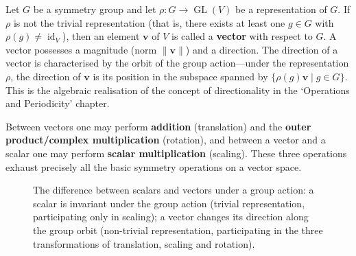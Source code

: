 \begin{definition}[Vector]\label{def:vector}
Let $G$ be a symmetry group and let $\rho: G \to \operatorname{GL}(V)$ be a representation of $G$. If $\rho$ is not the trivial representation (that is, there exists at least one $g \in G$ with $\rho(g) \neq \operatorname{id}_V$), then an element $\mathbf{v}$ of $V$ is called a \textbf{vector} with respect to $G$. A vector possesses a magnitude (norm $\|\mathbf{v}\|$) and a direction. The direction of a vector is characterised by the orbit of the group action---under the representation $\rho$, the direction of $\mathbf{v}$ is its position in the subspace spanned by $\{\rho(g)\mathbf{v} \mid g \in G\}$. This is the algebraic realisation of the concept of directionality in the `Operations and Periodicity' chapter.

Between vectors one may perform \textbf{addition} (translation) and the \textbf{outer product/complex multiplication} (rotation), and between a vector and a scalar one may perform \textbf{scalar multiplication} (scaling). These three operations exhaust precisely all the basic symmetry operations on a vector space.
\end{definition}

\begin{figure}[htbp]
\centering
{}
\caption{The difference between scalars and vectors under a group action: a scalar is invariant under the group action (trivial representation, participating only in scaling); a vector changes its direction along the group orbit (non-trivial representation, participating in the three transformations of translation, scaling and rotation).}
\label{fig:scalar_vector_group_action}
\end{figure}

